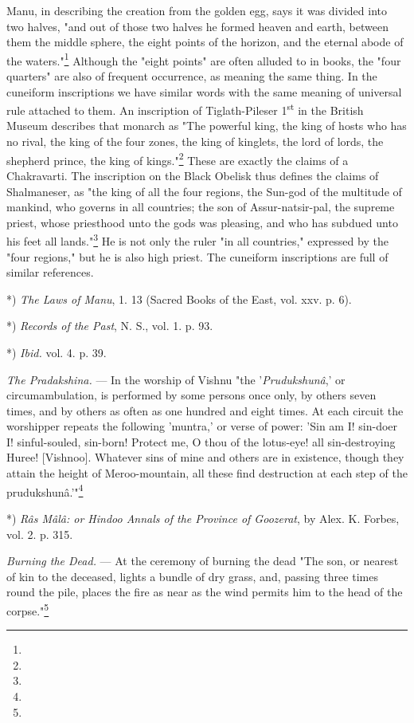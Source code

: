 \documentclass[a4paper, 11pt, oneside, polutonikogreek, english]{article}
\begin{document}
Manu, in describing the creation from the golden egg, says it was divided into two halves, "and out of those two halves he formed heaven and earth, between them the middle sphere, the eight points of the horizon, and the eternal abode of the waters."\footnote{} Although the "eight points" are often alluded to in books, the "four quarters" are also of frequent occurrence, as meaning the same thing. In the cuneiform inscriptions we have similar words with the same meaning of universal rule attached to them. An inscription of Tiglath-Pileser 1\textsuperscript{st} in the British Museum describes that monarch as "The powerful king, the king of hosts who has no rival, the king of the four zones, the king of kinglets, the lord of lords, the shepherd prince, the king of kings."\footnote{} These are exactly the claims of a Chakravarti. The inscription on the Black Obelisk thus defines the claims of Shalmaneser, as "the king of all the four regions, the Sun-god of the multitude of mankind, who governs in all countries; the son of Assur-natsir-pal, the supreme priest, whose priesthood unto the gods was pleasing, and who has subdued unto his feet all lands."\footnote{} He is not only the ruler "in all countries," expressed by the "four regions," but he is also high priest. The cuneiform inscriptions are full of similar references.

*) \emph{The Laws of Manu}, 1. 13 (Sacred Books of the East, vol. xxv. p. 6).

*) \emph{Records of the Past}, N. S., vol. 1. p. 93.

*) \emph{Ibid.} vol. 4. p. 39.

\emph{The Pradakshina.} --- In the worship of Vishnu "the '\emph{Prudukshunâ},' or circumambulation, is performed by some persons once only, by others seven times, and by others as often as one hundred and eight times. At each circuit the worshipper repeats the following 'muntra,' or verse of power: 'Sin am I! sin-doer I! sinful-souled, sin-born! Protect me, O thou of the lotus-eye! all sin-destroying Huree! [Vishnoo]. Whatever sins of mine and others are in existence, though they attain the height of Meroo-mountain, all these find destruction at each step of the prudukshunâ.'"\footnote{}

*) \emph{Râs Mâlâ: or Hindoo Annals of the Province of Goozerat}, by Alex. K. Forbes, vol. 2. p. 315.

\emph{Burning the Dead.} --- At the ceremony of burning the dead "The son, or nearest of kin to the deceased, lights a bundle of dry grass, and, passing three times round the pile, places the fire as near as the wind permits him to the head of the corpse."\footnote{}
\end{document}
